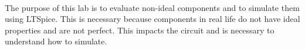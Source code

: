 \documentclass{article}
\begin{document}
\paragraph{}
The purpose of this lab is to evaluate non-ideal components and to simulate them using LTSpice. This is necessary because components in real life
do not have ideal properties and are not perfect. This impacts the circuit and is necessary to understand how to simulate.


\end{document}
